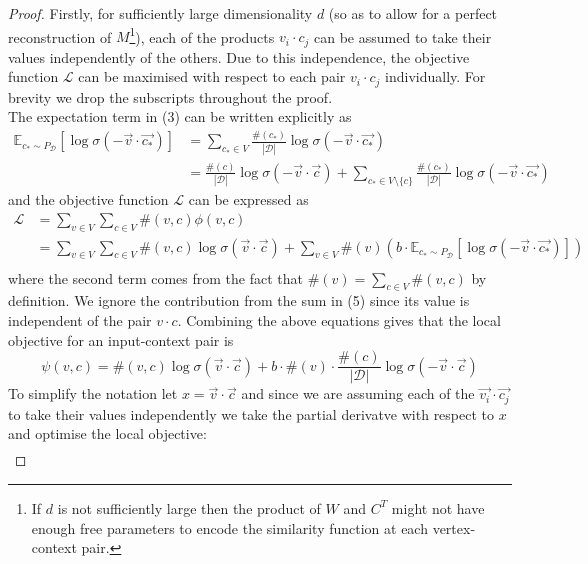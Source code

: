 \documentclass[a4paper]{article}
\renewcommand{\E}{\mathbb E}
\newcommand{\D}{\mathcal D}
\begin{document}
\begin{proof}
  Firstly, for sufficiently large dimensionality $d$ (so as to allow for a perfect
  reconstruction of $M$\footnote{If $d$ is not sufficiently large then the product of $W$ and $C^T$ might not have enough free parameters to encode the similarity function at each vertex-context pair.}), each of the products $v_i \cdot c_j$ can be assumed to
  take their values independently of the others. Due to this independence, the objective function $\mathcal{L}$ can be maximised with
  respect to each pair $v_i \cdot c_j$ individually. For brevity we drop the subscripts throughout the proof.\\
  The expectation term in (3) can be written explicitly as
  \begin{align}
    \E_{c_* \sim P_{\D}}[\log{\sigma(-\vec{v} \cdot \vec{c_*})}] &= \sum_{c_* \in V}{\frac{\#(c_*)}{|\D|} \log{\sigma(-\vec{v} \cdot \vec{c_*})}}\\
                                                                             &= \frac{\#(c)}{|\D|} \log{\sigma(-\vec{v} \cdot \vec{c})} + \sum_{c_*\in V \setminus \{c\}}{\frac{\#(c_*)}{|\D|} \log{\sigma(-\vec{v} \cdot \vec{c_*})}}
  \end{align}
  and the objective function $\mathcal{L}$ can be expressed as
  \begin{align*}
    \mathcal{L} &= \sum_{v \in V}\sum_{c \in V}\#(v, c)\phi(v,c)\\
    &=\sum_{v \in V}\sum_{c \in V}\#(v, c)\log{\sigma(\vec{v} \cdot \vec{c})} + \sum_{v \in V}\#(v)\left(b \cdot \E_{c _* \sim P_{\D}}[\log{\sigma(-\vec{v} \cdot \vec{c_*})}] \right)\\
  \end{align*}
  where the second term comes from the fact that $\#(v) = \sum_{c \in V}\#(v,c)$
  by definition. We ignore the contribution from the sum in (5) since its value is independent of the pair $v \cdot c$. Combining the above equations gives that the local objective for an input-context
  pair is
  \begin{equation*}
    \psi(v, c) = \#(v, c)\log{\sigma(\vec{v} \cdot \vec{c})} + b \cdot \#(v)\cdot \frac{\#(c)}{|\D|}\log{\sigma(-\vec{v} \cdot \vec{c})} 
  \end{equation*}
  To simplify the notation let $x = \vec{v} \cdot \vec{c}$ and since we are
  assuming each of the $\vec{v_i} \cdot \vec{c_j}$ to take their values independently we take the partial derivatve with respect to $x$ and optimise
  the local objective:
  \begin{align*}

\end{align*}
\end{proof}
\end{document}
